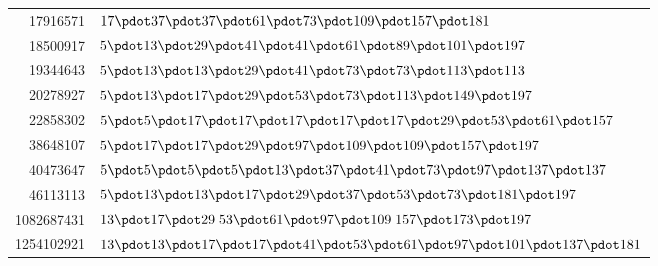 \begin{longtable}{@{}r|l@{}}
17916571 & $17\pdot 37\pdot 37\pdot 61\pdot 73\pdot 109\pdot 157\pdot 181$\\
18500917 & $5\pdot 13\pdot 29\pdot 41\pdot 41\pdot 61\pdot 89\pdot 101\pdot 197$\\
19344643 & $5\pdot 13\pdot 13\pdot 29\pdot 41\pdot 73\pdot 73\pdot 113\pdot 113$\\
20278927 & $5\pdot 13\pdot 17\pdot 29\pdot 53\pdot 73\pdot 113\pdot 149\pdot 197$\\
22858302 & $5\pdot 5\pdot 17\pdot 17\pdot 17\pdot 17\pdot 17\pdot 29\pdot 53\pdot 61\pdot 157$\\
38648107 & $5\pdot 17\pdot 17\pdot 29\pdot 97\pdot 109\pdot 109\pdot 157\pdot 197$\\
40473647 & $5\pdot 5\pdot 5\pdot 5\pdot 13\pdot 37\pdot 41\pdot 73\pdot 97\pdot 137\pdot 137$\\
46113113 & $5\pdot 13\pdot 13\pdot 17\pdot 29\pdot 37\pdot 53\pdot 73\pdot 181\pdot 197$\\
1082687431 & $13\pdot 17\pdot 29\;53\pdot 61\pdot 97\pdot 109\;157\pdot 173\pdot 197$\\
1254102921 & $13\pdot 13\pdot 17\pdot 17\pdot 41\pdot 53\pdot 61\pdot 97\pdot 101\pdot 137\pdot 181$\\
\end{longtable}\endgroup
\par\medskip\begingroup\small\setlength{\tabcolsep}{5pt}
